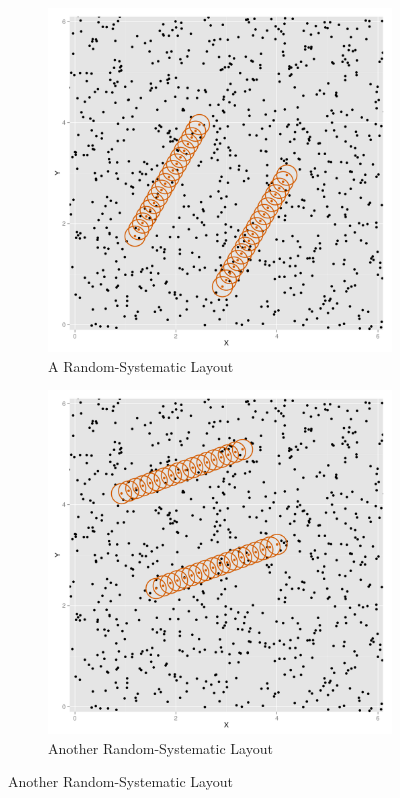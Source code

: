 \documentclass[12pt]{article}
\begin{document}
\begin{figure}
	\begin{subfigure}[b]{0.45\textwidth}
		\includegraphics[width=\textwidth]{../images/layout_rand-sys-4.pdf}
		\caption{A Random-Systematic Layout}
		\label{fig:structured}
	\end{subfigure}
	\begin{subfigure}[b]{0.45\textwidth}
		\includegraphics[width=\textwidth]{../images/layout_rand-sys-6.pdf}
		\caption{Another Random-Systematic Layout}
		\label{fig:structured}
	\end{subfigure}
\end{figure}
\end{document}

